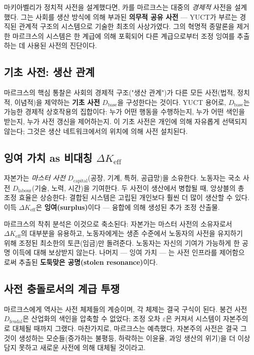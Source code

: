 \documentclass[12pt,a4paper]{article}
\newcommand{\Keff}{K_{\mathrm{eff}}}
\begin{document}
	마키아벨리가 정치적 사전을 설계했다면, 카를 마르크스는 대중의 \emph{경제적} 사전을 설계했다. 그는 사회를 생산 방식에 의해 부과된 \textbf{의무적 공유 사전} — YUCT가 부르는 경직된 관계적 구조의 시스템으로 기술한 최초의 사상가였다. 그의 혁명적 종말론을 제거한 마르크스의 시스템은 한 계급에 의해 포획되어 다른 계급으로부터 조정 잉여를 추출하는 데 사용된 사전의 진단이다.
	
	\subsection{기초 사전: 생산 관계}
	
	마르크스의 핵심 통찰은 사회의 경제적 구조("생산 관계")가 다른 모든 사전(법적, 정치적, 이념적)을 제약하는 \textbf{기초 사전} \(D_{\text{base}}\)을 구성한다는 것이다. YUCT 용어로, \(D_{\text{base}}\)는 가능한 경제적 상호작용의 집합이다: 누가 어떤 행동을 수행하는지, 누가 어떤 색인을 받는지, 누가 사전 갱신을 제어하는지. 이 기초 사전은 개인에 의해 자유롭게 선택되지 않는다; 그것은 생산 네트워크에서의 위치에 의해 사전 설치된다.
	
	\subsection{잉여 가치 as 비대칭 \(\Delta\Keff\)}
	
	자본가는 \emph{마스터 사전} \(D_{\text{capital}}\)(공장, 기계, 특허, 공급망)을 소유한다. 노동자는 국소 사전 \(D_{\text{labour}}\)(기술, 노력, 시간)을 기여한다. 두 사전이 생산에서 병합될 때, 앙상블의 총 조정 효율은 상승한다: 결합된 시스템은 고립된 개인보다 훨씬 더 많이 생산할 수 있다. 이득 \(\Delta\Keff\)은 \textbf{잉여(surplus)}이다 — 융합에 의해 생성된 추가 조정 산출물.
	
	마르크스의 착취 분석은 이것으로 축소된다: 자본가는 마스터 사전의 소유자로서 \(\Delta\Keff\)의 대부분을 유용하고, 노동자에게는 생존 수준에서 노동자의 사전을 유지하기 위해 조정된 최소한의 토큰(임금)만 돌려준다. 노동자는 자신의 기여가 가능하게 한 공명 이득에 대해 보상받지 않는다. 나머지 — 잉여 가치 — 는 사전 인프라를 제어함으로써 추출된 \textbf{도둑맞은 공명(stolen resonance)}이다.
	
	\subsection{사전 충돌로서의 계급 투쟁}
	
	마르크스에게 역사는 사전 체제들의 계승이며, 각 체제는 결국 구식이 된다. 봉건 사전 \(D_{\text{feudal}}\)은 산업화의 색인을 압축할 수 없었다; 조정 오차 \(\varepsilon\)은 커져서 시스템이 자본주의로 대체될 때까지 그랬다. 마찬가지로, 마르크스는 예측했다, 자본주의 사전은 결국 그것이 생성하는 모순들(증가하는 불평등, 하락하는 이윤율, 과잉 생산의 위기)을 더 이상 담지 못하고 새로운 사전에 의해 대체될 것이라고.
	
\end{document}

